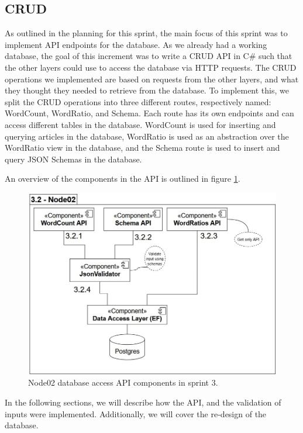 \subsection{CRUD}

As outlined in the planning for this sprint, the main focus of this sprint was to implement API endpoints for the database.
As we already had a working database, the goal of this increment was to write a CRUD API in C\# such that the other layers could use to access the database via HTTP requests.
The CRUD operations we implemented are based on requests from the other layers, and what they thought they needed to retrieve from the database.
To implement this, we split the CRUD operations into three different routes, respectively named: WordCount, WordRatio, and Schema. Each route has its own endpoints and can access different tables in the database. WordCount is used for inserting and querying articles in the database, WordRatio is used as an abstraction over the WordRatio view in the database, and the Schema route is used to insert and query JSON Schemas in the database.

An overview of the components in the API is outlined in figure \ref{Node02Sprint3}.

\begin{figure}[h]
    \centering
    \includegraphics[width=\linewidth]{Images/Node02Pipeline.jpg}
    \caption{Node02 database access API components in sprint 3.}
    \label{Node02Sprint3}
\end{figure}

In the following sections, we will describe how the API, and the validation of inputs were implemented. Additionally, we will cover the re-design of the database.

